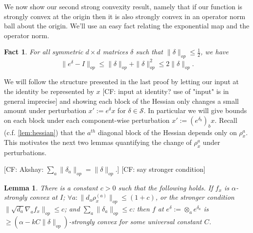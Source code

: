 \documentclass{article}
\newtheorem{lemma}[theorem]{Lemma}
\newtheorem{fact}[theorem]{Fact}
\newcommand\Sym{\mathcal{S}}
\newcommand\samp{x}
\newcommand\tr{\operatorname{Tr}}
\newcommand{\CF}[1]{{\color{purple}[CF: #1]}}
\begin{document}



We now show our second strong convexity result, namely that if our function is strongly convex at the origin then it is also strongly convex in an operator norm ball about the origin. We'll use an easy fact relating the exponential map and the operator norm.

\begin{fact} For all symmetric $d\times d$ matrices $\delta $ such that $ \|\delta\|_{op} \leq \frac{1}{2}$, we have 
$$ \|e^{\delta} - I\|_{op} \leq \|\delta\|_{op} + \|\delta\|_{op}^{2} \leq 2 \|\delta\|_{op}.$$ 
\end{fact}

We will follow the structure presented in the last proof by letting our input at the identity be represented by $x$ \CF{input at identity? use of "input" is in general imprecise} and showing each block of the Hessian only changes a small amount under perturbation $x' := e^{\delta} x$ for $\delta \in \Sym$. In particular we will give bounds on each block under each component-wise perturbation $x' := (e^{\delta_{b}})_{b} x$. Recall (c.f. \cref{lem:hessian}) that the $a^{th}$ diagonal block of the Hessian depends only on $\rho^a_{\samp}$. This motivates the next two lemmas quantifying the change of $\rho^{a}
_{\samp}$ under perturbations. 

\CF{Akshay: $\sum_{a} \|\delta_{a}\|_{op} = \|\delta\|_{op}.$}
\CF{say stronger condition}
\begin{lemma} \label{convexRobustness}
There is a constant $c>0$ such that the following holds. If $f_{\samp}$ is $\alpha$-strongly convex at $I$; $\forall a: \|d_{a} \rho_{\samp}^{(a)}\|_{op} \leq (1+c)$, or the stronger condition $\|\sqrt{d_{a}} \nabla_{a} f_{\samp}\|_{op} \leq c$; and $\sum_{a} \|\delta_{a}\|_{op} \leq c$: then $f$ at $e^{\delta} := \otimes_{a} e^{\delta_{a}}$ is $\geq (\alpha - k C \|\delta\|_{op})$-strongly convex for some universal constant $C$. 
\end{lemma}
\end{document}
